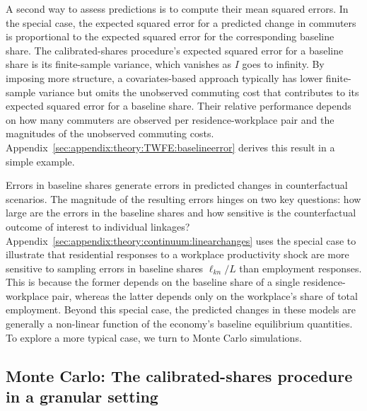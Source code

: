 \documentclass[11pt]{article}
\theoremstyle{definition}
\begin{document}
A second way to assess predictions is to compute their mean squared errors.
In the special case, the expected squared error for a predicted change in commuters
is proportional to the expected squared error for the corresponding baseline share.
The calibrated-shares procedure's expected squared error for a baseline share is its finite-sample variance,
which vanishes as $I$ goes to infinity.
By imposing more structure, a covariates-based approach typically has lower finite-sample variance but omits the unobserved commuting cost that contributes to its expected squared error for a baseline share.
Their relative performance depends on how many commuters are observed per residence-workplace pair and the magnitudes of the unobserved commuting costs.
Appendix~\ref{sec:appendix:theory:TWFE:baselineerror} derives this result in a simple example.

Errors in baseline shares generate errors in predicted changes in counterfactual scenarios.
The magnitude of the resulting errors hinges on two key questions:
how large are the errors in the baseline shares
and
how sensitive is the counterfactual outcome of interest to individual linkages?
Appendix~\ref{sec:appendix:theory:continuum:linearchanges} uses the special case
to illustrate that
residential responses to a workplace productivity shock are more sensitive to sampling errors in baseline shares $\ell_{kn}/L$
than employment responses.
This is because
the former depends on the baseline share of a single residence-workplace pair,
whereas the latter depends only on the workplace's share of total employment.
Beyond this special case,
the predicted changes in these models are generally a non-linear function of the economy's baseline equilibrium quantities.
To explore a more typical case, we turn to Monte Carlo simulations.

\subsection{Monte Carlo: The calibrated-shares procedure in a granular setting}\label{sec:ctflgranular:MonteCarlo}
\end{document}
